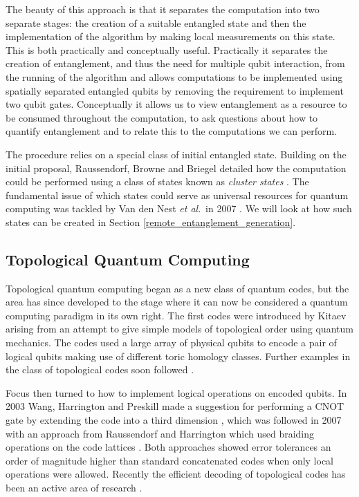 The beauty of this approach is that it separates the computation into two separate stages: the creation of a suitable entangled state and then the implementation of the algorithm by making local measurements on this state. This is both practically and conceptually useful. Practically it separates the creation of entanglement, and thus the need for multiple qubit interaction, from the running of the algorithm and allows computations to be implemented using spatially separated entangled qubits by removing the requirement to implement two qubit gates. Conceptually it allows us to view entanglement as a resource to be consumed throughout the computation, to ask questions about how to quantify entanglement and to relate this to the computations we can perform.

The procedure relies on a special class of initial entangled state. Building on the initial proposal, Raussendorf, Browne and Briegel detailed how the computation could be performed using a class of states known as \textit{cluster states} \cite{mbqc_cluster_03}. The fundamental issue of which states could serve as universal resources for quantum computing was tackled by Van den Nest \textit{et al}.\ in 2007 \cite{which_states_universal_resources}. We will look at how such states can be created in Section \ref{remote_entanglement_generation}.

\subsection{Topological Quantum Computing}

Topological quantum computing began as a new class of quantum codes, but the area has since developed to the stage where it can now be considered a quantum computing paradigm in its own right. The first codes were introduced by Kitaev \cite{kitaev_1, kitaev_2} arising from an attempt to give simple models of topological order using quantum mechanics. The codes used a large array of physical qubits to encode a pair of logical qubits making use of different toric homology classes. Further examples in the class of topological codes soon followed \cite{kitaev_bravyi, planar_codes_freedman_meyer}.

Focus then turned to how to implement logical operations on encoded qubits. In 2003 Wang, Harrington and Preskill made a suggestion for performing a CNOT gate by extending the code into a third dimension \cite{planar_cnot_preskill}, which was followed in 2007 with an approach from Raussendorf and Harrington which used braiding operations on the code lattices \cite{raussendorf07, raussendorf07_2}. Both approaches showed error tolerances an order of magnitude higher than standard concatenated codes when only local operations were allowed. Recently the efficient decoding of topological codes has been an active area of research \cite{fowler_matching_12, poulin_renormalisation, poulin_renormalisation2, wooton_mcmc1}.


